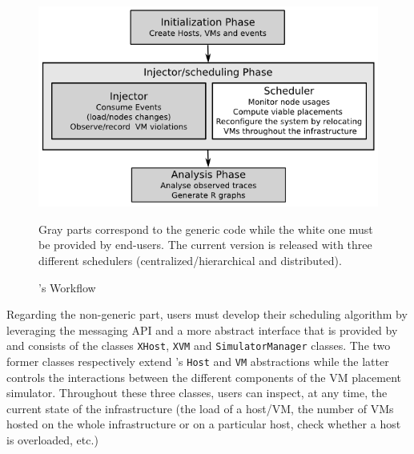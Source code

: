 \begin{figure}
  {\centering ~\includegraphics[width=.95\linewidth]{figures/VMPlaceS-workflow.png}}
  \caption{\vmps's Workflow}
  \label{fig:workflow}
{\small Gray parts correspond to the generic code while the white one
  must be provided by end-users. The current version is released with
  three different schedulers (centralized/hierarchical and distributed).}
\end{figure}


Regarding the non-generic part, users must develop their scheduling
algorithm by leveraging the \sg messaging API and a more abstract
interface that is provided by \vmps and consists of the classes
\texttt{XHost}, \texttt{XVM} and \texttt{SimulatorManager} classes.
The two former classes respectively extend \sg's \texttt{Host} and
\texttt{VM} abstractions while the latter controls the interactions
between the different components of the VM placement simulator.
Throughout these three classes, users can inspect, at any time, the
current state of the infrastructure (\ie the load of a host/VM, the
number of VMs hosted on the whole infrastructure or on a particular
host, check whether a host is overloaded,
etc.)


